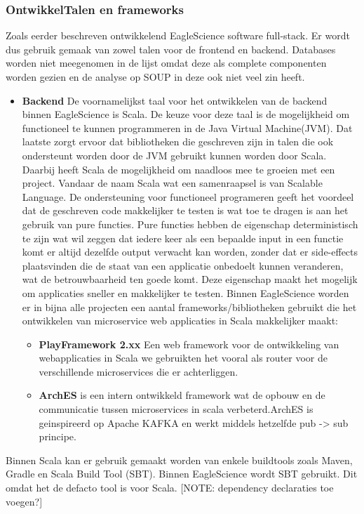\subsubsection{OntwikkelTalen en frameworks}\label{subsec:ontwikkeltalen-en-frameworks}
Zoals eerder beschreven ontwikkelend EagleScience software full-stack. Er wordt dus gebruik gemaak van zowel talen voor de frontend en backend. Databases worden niet meegenomen in de lijst omdat deze als complete componenten worden gezien en de analyse op SOUP in deze ook niet veel zin heeft.
\begin{itemize}
    \item \textbf{Backend} De voornamelijkst taal voor het ontwikkelen van de backend binnen EagleScience is Scala. De keuze voor deze taal is de mogelijkheid om functioneel te kunnen programmeren in de Java Virtual Machine(JVM). Dat laatste zorgt ervoor dat bibliotheken die geschreven zijn in talen die ook ondersteunt worden door de JVM gebruikt kunnen worden door Scala. Daarbij heeft Scala de mogelijkheid om naadloos mee te groeien met een project. Vandaar de naam Scala wat een samenraapsel is van Scalable Language. De ondersteuning voor functioneel programeren geeft het voordeel dat de geschreven code makkelijker te testen is wat toe te dragen is aan het gebruik van pure functies. Pure functies hebben de eigenschap deterministisch te zijn wat wil zeggen dat iedere keer als een bepaalde input in een functie komt er altijd dezelfde output verwacht kan worden, zonder dat er side-effects plaatsvinden die de staat van een applicatie onbedoelt kunnen veranderen, wat de betrouwbaarheid ten goede komt. Deze eigenschap maakt het mogelijk om applicaties sneller en makkelijker te testen. Binnen EagleScience worden er in bijna alle projecten een aantal frameworks/bibliotheken gebruikt die het ontwikkelen van microservice web applicaties in Scala makkelijker maakt:
    \begin{itemize}
        \item \textbf{PlayFramework 2.xx} Een web framework voor de ontwikkeling van webapplicaties in Scala we gebruikten het vooral als router voor de verschillende microservices die er achterliggen.
        \item \textbf{ArchES} is een intern ontwikkeld framework wat de opbouw en de communicatie tussen microservices in scala verbeterd.ArchES is geinspireerd op Apache KAFKA en werkt middels hetzelfde pub -> sub principe.
    \end{itemize}
\end{itemize}
Binnen Scala kan er gebruik gemaakt worden van enkele buildtools zoals Maven, Gradle en Scala Build Tool (SBT). Binnen EagleScience wordt SBT gebruikt. Dit omdat het de defacto tool is voor Scala.
[NOTE: dependency declaraties toe voegen?]

